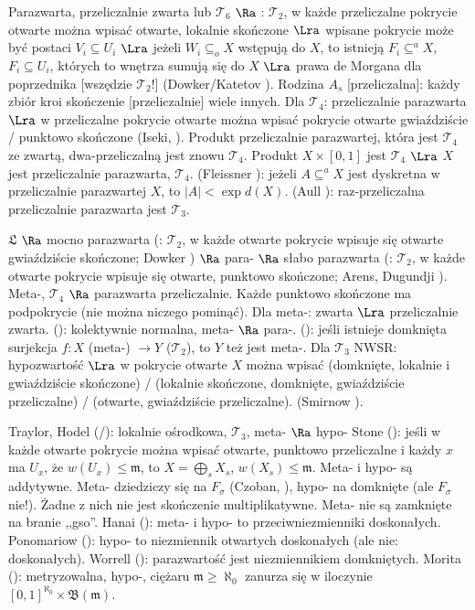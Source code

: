 Parazwarta, przeliczalnie zwarta lub $\mathcal T_6$  $\Ra$ : $\mathcal T_2$, w każde przeliczalne pokrycie otwarte można wpisać otwarte, lokalnie skończone $\Lra$ wpisane pokrycie może być postaci $V_i \subseteq U_i$ $\Lra$ jeżeli $W_i \subseteq_o X$ wstępują do $X$, to istnieją $F_i \subseteq^a X$, $F_i \subseteq U_i$, których to wnętrza sumują się do $X$ $\Lra$ prawa de Morgana dla poprzednika [wszędzie $\mathcal T_2$!] (Dowker/Katetov ).
Rodzina $A_s$  [przeliczalna]: każdy zbiór kroi skończenie [przeliczalnie] wiele innych.
Dla $\mathcal T_4$: przeliczalnie parazwarta $\Lra$ w przeliczalne pokrycie otwarte można wpisać pokrycie otwarte gwiaździście / punktowo skończone (Iseki, ).
Produkt przeliczalnie parazwartej, która jest $\mathcal T_4$ ze zwartą, dwa-przeliczalną jest znowu $\mathcal T_4$.
Produkt $X \times [0,1]$ jest $\mathcal T_4$ $\Lra$ $X$ jest przeliczalnie parazwarta, $\mathcal T_4$.
(Fleissner ): jeżeli $A \subseteq^a X$ jest dyskretna w przeliczalnie parazwartej $X$, to $|A| < \exp d(X)$. %
(Aull ): raz-przeliczalna przeliczalnie parazwarta jest $\mathcal T_3$.

$\mathfrak L$  $\Ra$ mocno parazwarta (: $\mathcal T_2$, w każde otwarte pokrycie wpisuje się otwarte gwiaździście skończone; Dowker ) $\Ra$ para- $\Ra$ słabo parazwarta (: $\mathcal T_2$, w każde otwarte pokrycie wpisuje się otwarte, punktowo skończone; Arens, Dugundji ).
Meta-, $\mathcal T_4$ $\Ra$ parazwarta przeliczalnie.
Każde punktowo skończone ma podpokrycie  (nie można niczego pominąć).
Dla meta-: zwarta $\Lra$ przeliczalnie zwarta.
 (): kolektywnie normalna, meta- $\Ra$ para-.
 (): jeśli istnieje domknięta surjekcja $f \colon X$ (meta-) $\to Y$ ($\mathcal T_2$), to $Y$ też jest meta-.
Dla $\mathcal T_3$ NWSR: hypozwartość $\Lra$ w pokrycie otwarte $X$ można wpisać (domknięte, lokalnie i gwiaździście skończone) / (lokalnie skończone, domknięte, gwiaździście przeliczalne) / (otwarte, gwiaździście przeliczalne). (Smirnow ).

Traylor, Hodel (/): lokalnie ośrodkowa, $\mathcal T_3$, meta- $\Ra$ hypo-
Stone (): jeśli w każde otwarte pokrycie można wpisać otwarte, punktowo przeliczalne i każdy $x$ ma $U_x$, że $w(U_x) \le \mathfrak m$, to $X = \bigoplus_s X_s$, $w(X_s )\le \mathfrak m$.
Meta- i hypo- są addytywne.
Meta- dziedziczy się na $F_\sigma$ (Czoban, ), hypo- na domknięte (ale $F_\sigma$ nie!).
Żadne z nich nie jest skończenie multiplikatywne.
Meta- nie są zamknięte na branie ,,gso''.
Hanai (): meta- i hypo- to przeciwniezmienniki doskonałych.
Ponomariow (): hypo- to niezmiennik otwartych doskonałych (ale nie: doskonałych).
Worrell (): parazwartość jest niezmiennikiem domkniętych.
Morita (): metryzowalna, hypo-, ciężaru $\mathfrak m \ge \aleph_0$ zanurza się w iloczynie $[0,1]^{\aleph_0} \times \mathfrak B(\mathfrak m)$.

